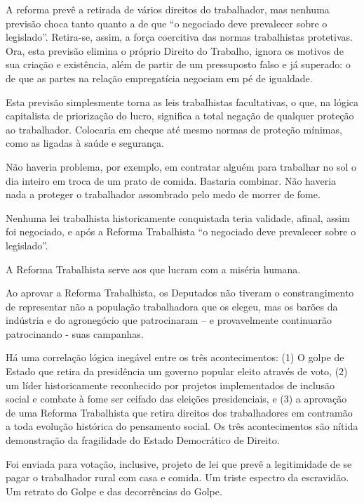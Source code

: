 A reforma prevê a retirada de vários direitos do trabalhador, mas
nenhuma previsão choca tanto quanto a de que ``o negociado deve
prevalecer sobre o legislado''. Retira-se, assim, a força coercitiva das
normas trabalhistas protetivas. Ora, esta previsão elimina o próprio
Direito do Trabalho, ignora os motivos de sua criação e existência, além
de partir de um pressuposto falso e já superado: o de que as partes na
relação empregatícia negociam em pé de igualdade.

Esta previsão simplesmente torna as leis trabalhistas facultativas, o
que, na lógica capitalista de priorização do lucro, significa a total
negação de qualquer proteção ao trabalhador. Colocaria em cheque até
mesmo normas de proteção mínimas, como as ligadas à saúde e segurança.

Não haveria problema, por exemplo, em contratar alguém para trabalhar no
sol o dia inteiro em troca de um prato de comida. Bastaria combinar. Não
haveria nada a proteger o trabalhador assombrado pelo medo de morrer de
fome.

Nenhuma lei trabalhista historicamente conquistada teria validade,
afinal, assim foi negociado, e após a Reforma Trabalhista ``o negociado
deve prevalecer sobre o legislado''.

A Reforma Trabalhista serve aos que lucram com a miséria humana.

Ao aprovar a Reforma Trabalhista, os Deputados não tiveram o
constrangimento de representar não a população trabalhadora que os
elegeu, mas os barões da indústria e do agronegócio que patrocinaram --
e provavelmente continuarão patrocinando - suas campanhas.

Há uma correlação lógica inegável entre os três acontecimentos: (1) O
golpe de Estado que retira da presidência um governo popular eleito
através de voto, (2) um líder historicamente reconhecido por projetos
implementados de inclusão social e combate à fome ser ceifado das
eleições presidenciais, e (3) a aprovação de uma Reforma Trabalhista que
retira direitos dos trabalhadores em contramão a toda evolução histórica
do pensamento social. Os três acontecimentos são nítida demonstração da
fragilidade do Estado Democrático de Direito.

Foi enviada para votação, inclusive, projeto de lei que prevê a
legitimidade de se pagar o trabalhador rural com casa e comida. Um
triste espectro da escravidão. Um retrato do Golpe e das decorrências do
Golpe.